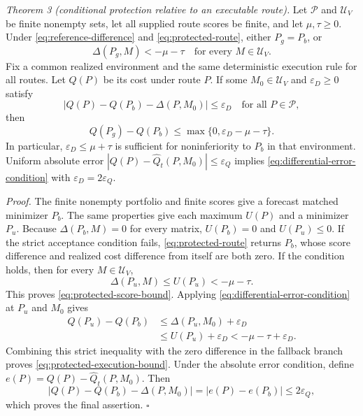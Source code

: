 \textit{Theorem 3 (conditional protection relative to an executable route).}
Let $\mathcal P$ and $\mathcal U_V$ be finite nonempty sets, let all supplied
route scores be finite, and let $\mu,\tau\ge0$.  Under
\eqref{eq:reference-difference} and \eqref{eq:protected-route}, either
$P_g=P_b$, or
\begin{equation}
\Delta(P_g,M)<-\mu-\tau
\quad\text{for every }M\in\mathcal U_V.
\label{eq:protected-score-bound}
\end{equation}
Fix a common realized environment and the same deterministic execution
rule for all routes.  Let $Q(P)$ be its cost under route $P$.  If some
$M_0\in\mathcal U_V$ and $\varepsilon_D\ge0$ satisfy
\begin{equation}
\left|Q(P)-Q(P_b)-\Delta(P,M_0)\right|\le\varepsilon_D
\quad\text{for all }P\in\mathcal P,
\label{eq:differential-error-condition}
\end{equation}
then
\begin{equation}
Q(P_g)-Q(P_b)\le\max\{0,\varepsilon_D-\mu-\tau\}.
\label{eq:protected-execution-bound}
\end{equation}
In particular, $\varepsilon_D\le\mu+\tau$ is sufficient for noninferiority
to $P_b$ in that environment.  Uniform absolute error
$|Q(P)-\widehat Q_t(P,M_0)|\le\varepsilon_Q$ implies
\eqref{eq:differential-error-condition} with
$\varepsilon_D=2\varepsilon_Q$.

\textit{Proof.}  The finite nonempty portfolio and finite scores give a
forecast matched minimizer $P_b$.  The same properties give each maximum
$U(P)$ and a minimizer $P_u$.  Because $\Delta(P_b,M)=0$ for every matrix,
$U(P_b)=0$ and $U(P_u)\le0$.  If the strict acceptance condition fails,
\eqref{eq:protected-route} returns $P_b$, whose score difference and
realized cost difference from itself are both zero.  If the condition
holds, then for every $M\in\mathcal U_V$,
\[
\Delta(P_u,M)\le U(P_u)<-\mu-\tau.
\]
This proves \eqref{eq:protected-score-bound}.  Applying
\eqref{eq:differential-error-condition} at $P_u$ and $M_0$ gives
\begin{align}
Q(P_u)-Q(P_b)
&\le\Delta(P_u,M_0)+\varepsilon_D \nonumber\\
&\le U(P_u)+\varepsilon_D
<-\mu-\tau+\varepsilon_D.
\end{align}
Combining this strict inequality with the zero difference in the fallback
branch proves \eqref{eq:protected-execution-bound}.  Under the absolute
error condition, define $e(P)=Q(P)-\widehat Q_t(P,M_0)$.  Then
\[
|Q(P)-Q(P_b)-\Delta(P,M_0)|
=|e(P)-e(P_b)|\le2\varepsilon_Q,
\]
which proves the final assertion.  \hfill $\square$

